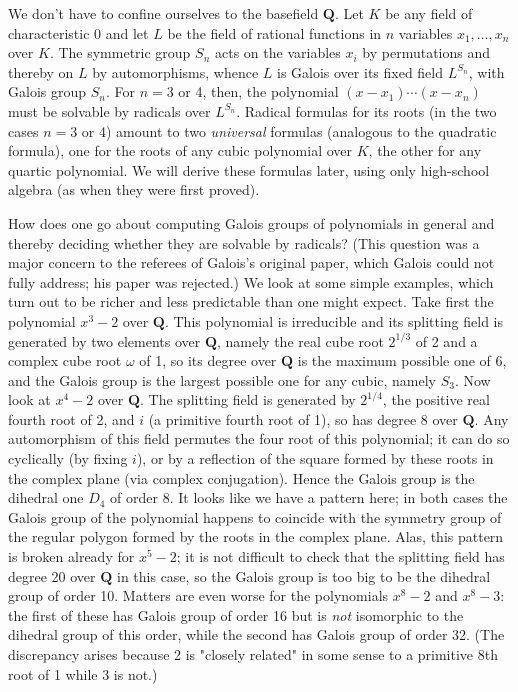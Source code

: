 \documentclass[10pt]{article}
\begin{document}
We don't have to confine ourselves to the basefield $\mathbf Q$. Let $K$
be any field of characteristic 0 and let $L$ be the field of rational
functions in $n$ variables $x_1,\ldots,x_n$ over $K$. The symmetric
group $S_n$ acts on the variables $x_i$ by permutations and thereby on
$L$ by automorphisms, whence $L$ is Galois over its fixed field
$L^{S_n}$, with Galois group $S_n$. For $n=3$ or 4, then, the polynomial
$(x-x_1)\cdots(x-x_n)$ must be solvable by radicals over $L^{S_n}$.
Radical formulas for its roots (in the two cases $n=3$ or 4) amount to
two {\sl universal} formulas (analogous to the quadratic formula), one
for the roots of any cubic polynomial over $K$, the other for any
quartic polynomial. We will derive these formulas later, using only
high-school algebra (as when they were first proved).

How does one go about computing Galois groups of polynomials in general
and thereby deciding whether they are solvable by radicals? (This
question was a major concern to the referees of Galois's original paper,
which Galois could not fully address; his paper was rejected.) We look
at some simple examples, which turn out to be richer and less
predictable than one might expect. Take first the polynomial $x^3 - 2$
over $\mathbf Q$. This polynomial is irreducible and its splitting field
is generated by two elements over $\mathbf Q$, namely the real cube root
$2^{1/3}$ of 2 and a complex cube root $\omega$ of 1, so its degree over
$\mathbf Q$ is the maximum possible one of 6, and the Galois group is
the largest possible one for any cubic, namely $S_3$. Now look at $x^4 -
2$ over $\mathbf Q$. The splitting field is generated by $2^{1/4}$, the
positive real fourth root of 2, and $i$ (a primitive fourth root of 1),
so has degree 8 over $\mathbf Q$. Any automorphism of this field
permutes the four root of this polynomial; it can do so cyclically (by
fixing $i$), or by a reflection of the square formed by these roots in
the complex plane (via complex conjugation). Hence the Galois group is
the dihedral one $D_4$ of order 8. It looks like we have a pattern here;
in both cases the Galois group of the polynomial happens to coincide
with the symmetry group of the regular polygon formed by the roots in
the complex plane. Alas, this pattern is broken already for $x^5 - 2$;
it is not difficult to check that the splitting field has degree 20 over
$\mathbf Q$ in this case, so the Galois group is too big to be the
dihedral group of order 10. Matters are even worse for the polynomials
$x^8 - 2$ and $x^8 - 3$: the first of these has Galois group of order 16
but is {\sl not} isomorphic to the dihedral group of this order, while
the second has Galois group of order 32. (The discrepancy arises because
2 is "closely related" in some sense to a primitive 8th root of 1 while
3 is not.)
\end{document}

